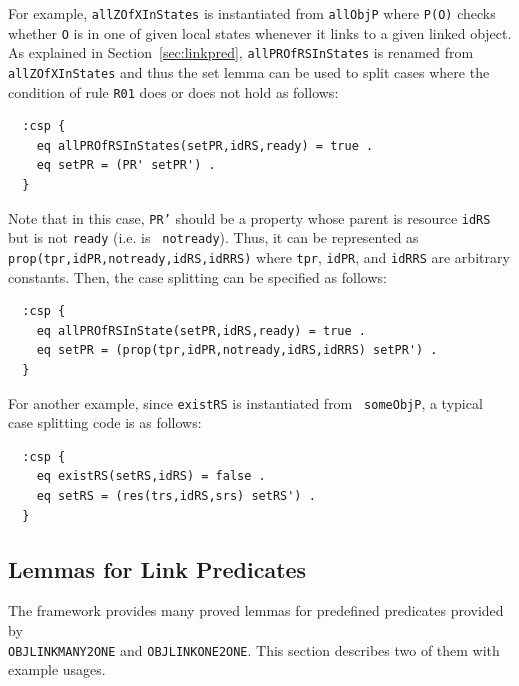 \documentclass[12pt]{report}
\newcommand{\stt}[1]{{\small{\tt {#1}}}}
\begin{document}
For example, {\tt allZOfXInStates} is instantiated from {\tt allObjP}
where \stt{P(O)} checks whether {\tt O} is in one of given local
states whenever it links to a given linked object.  As explained in
Section~\ref{sec:linkpred}, {\tt allPROfRSInStates} is renamed
from {\tt allZOfXInStates} and thus the set lemma can be used to
split cases where the condition of rule {\tt R01} does or does not
hold as follows:
\begin{verbatim}
  :csp {
    eq allPROfRSInStates(setPR,idRS,ready) = true .
    eq setPR = (PR' setPR') .
  }
\end{verbatim}
Note that in this case, {\tt PR'} should be a property whose parent is
resource {\tt idRS} but is not {\tt ready} (i.e. is {\tt
  notready}). Thus, it can be represented as
\stt{prop(tpr,idPR,notready,idRS,idRRS)} where {\tt tpr}, {\tt idPR},
and {\tt idRRS} are arbitrary constants. Then, the case splitting
can be specified as follows:
\begin{verbatim}
  :csp {
    eq allPROfRSInState(setPR,idRS,ready) = true .
    eq setPR = (prop(tpr,idPR,notready,idRS,idRRS) setPR') .
  }
\end{verbatim}

For another example, since {\tt existRS} is instantiated from {\tt
  someObjP}, a typical case splitting code is as follows:
\begin{verbatim}
  :csp {
    eq existRS(setRS,idRS) = false .
    eq setRS = (res(trs,idRS,srs) setRS') .
  }
\end{verbatim}
\subsection{Lemmas for Link Predicates}
\label{sec:linklemma}
The framework provides many proved lemmas for predefined predicates
provided by\\ {\tt OBJLINKMANY2ONE} and {\tt OBJLINKONE2ONE}. This
section describes two of them with example usages.
\end{document}
